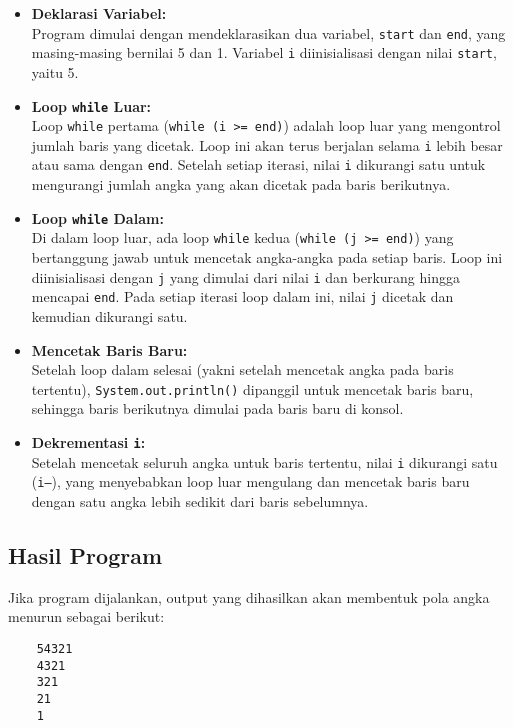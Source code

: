 \begin{itemize}
	\item \textbf{Deklarasi Variabel:}\\
	Program dimulai dengan mendeklarasikan dua variabel, \texttt{start} dan \texttt{end}, yang masing-masing bernilai 5 dan 1. Variabel \texttt{i} diinisialisasi dengan nilai \texttt{start}, yaitu 5.
	
	\item \textbf{Loop \texttt{while} Luar:} \\
	Loop \texttt{while} pertama (\texttt{while (i >= end)}) adalah loop luar yang mengontrol jumlah baris yang dicetak. Loop ini akan terus berjalan selama \texttt{i} lebih besar atau sama dengan \texttt{end}. Setelah setiap iterasi, nilai \texttt{i} dikurangi satu untuk mengurangi jumlah angka yang akan dicetak pada baris berikutnya.
	
	\item \textbf{Loop \texttt{while} Dalam:} \\
	Di dalam loop luar, ada loop \texttt{while} kedua (\texttt{while (j >= end)}) yang bertanggung jawab untuk mencetak angka-angka pada setiap baris. Loop ini diinisialisasi dengan \texttt{j} yang dimulai dari nilai \texttt{i} dan berkurang hingga mencapai \texttt{end}. Pada setiap iterasi loop dalam ini, nilai \texttt{j} dicetak dan kemudian dikurangi satu.
	
	\item \textbf{Mencetak Baris Baru:} \\
	Setelah loop dalam selesai (yakni setelah mencetak angka pada baris tertentu), \texttt{System.out.println()} dipanggil untuk mencetak baris baru, sehingga baris berikutnya dimulai pada baris baru di konsol.
	
	\item \textbf{Dekrementasi \texttt{i}:} \\
	Setelah mencetak seluruh angka untuk baris tertentu, nilai \texttt{i} dikurangi satu (\texttt{i--}), yang menyebabkan loop luar mengulang dan mencetak baris baru dengan satu angka lebih sedikit dari baris sebelumnya.
\end{itemize}

\subsection{Hasil Program}
Jika program dijalankan, output yang dihasilkan akan membentuk pola angka menurun sebagai berikut:

\begin{verbatim}
	54321
	4321
	321
	21
	1
\end{verbatim}


